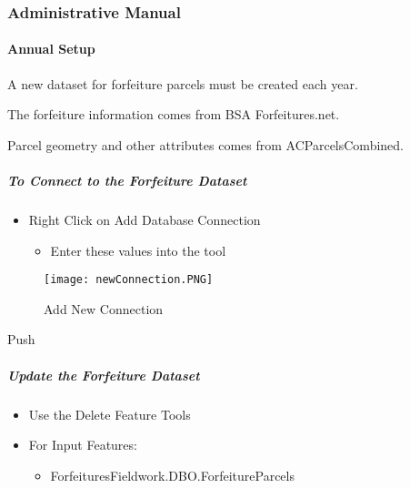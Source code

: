  \subsubsection{Administrative Manual}

 \paragraph{Annual Setup}

 A new dataset for forfeiture parcels must be created each year.

 \noindent The forfeiture information comes from BSA Forfeitures.net.

 \noindent Parcel geometry and other attributes comes from ACParcelsCombined.



\subparagraph{To Connect to the Forfeiture Dataset}

 \begin{itemize}
 \item {\Large Right Click on Add Database Connection}
 
 \begin{itemize}
 \item {\Large Enter these values into the tool}
 \end{itemize}
 \end{itemize}

 \vspace{.1in}

 \begin{figure}[h!]
 \centering
     \texttt{[image: newConnection.PNG]}
 \caption{Add New Connection}
 \end{figure}
 \vspace{.15in}

{\bigbtn Push }

\clearpage


 \subparagraph{Update the Forfeiture Dataset}

 \begin{itemize}
 \item {\Large Use the Delete Feature Tools}
 \item {\Large For Input Features:}
 \begin{itemize}
 \item {\Large ForfeituresFieldwork.DBO.ForfeitureParcels}
 \end{itemize}
 \end{itemize}

